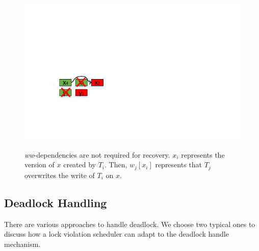 \documentclass[conference]{IEEEtran}
\begin{document}
\begin{figure}[tbp]
  {
    \includegraphics[scale=1.5] {figure/version3} \label{fig:versions_c}}
  \caption{\emph{ww}-dependencies are not required for recovery.
  ${x_i}$ represents the version of $x$ created by ${T_i}$.
 Then, $w_j[x_i]$ represents that ${T_j}$ overwrites the write of ${T_i}$ on $x$.
}
\label{fig:versions_example}
\end{figure}


\subsection {Deadlock Handling}
\label{sec:deadlock_handling}
There are various approaches to handle deadlock.
We choose two typical ones to discuss how a lock violation scheduler can adapt to the deadlock handle mechanism.
\end{document}

